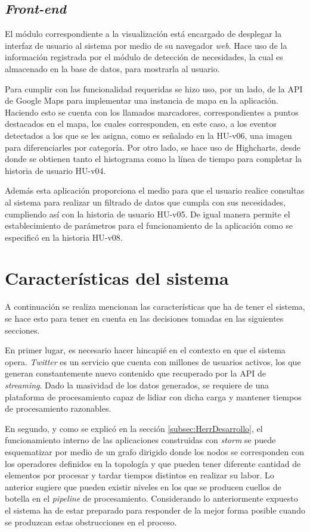 \subsection{\textit{Front-end}}
\label{subsec:front}

El módulo correspondiente a la visualización está encargado de desplegar la interfaz de usuario al sistema por medio de su navegador \textit{web}. Hace uso de la información registrada por el módulo de detección de necesidades, la cual es almacenado en la base de datos, para mostrarla al usuario. 

Para cumplir con las funcionalidad requeridas se hizo uso, por un lado, de la API de Google Maps para implementar una instancia de mapa en la aplicación. Haciendo esto se cuenta con los llamados marcadores, correspondientes a puntos destacados en el mapa, los cuales corresponden, en este caso, a los eventos detectados a los que se les asigna, como es señalado en la HU-v06, una imagen para diferenciarles por categoría. Por otro lado, se hace uso de Highcharts, desde donde se obtienen tanto el histograma como la línea de tiempo para completar la historia de usuario HU-v04.

Además esta aplicación proporciona el medio para que el usuario realice consultas al sistema para realizar un filtrado de datos que cumpla con sus necesidades, cumpliendo así con la historia de usuario HU-v05. De igual manera permite el establecimiento de parámetros para el funcionamiento de la aplicación como se especificó en la historia HU-v08.

\section{Características del sistema}
\label{sec:caracteristicasSistema}

A continuación se realiza mencionan las características que ha de tener el sistema, se hace esto para tener en cuenta en las decisiones tomadas en las siguientes secciones.

En primer lugar, es necesario hacer hincapié en el contexto en que el sistema opera. \textit{Twitter} es un servicio que cuenta con millones de usuarios activos, los que generan constantemente nuevo contenido que recuperado por la API de \textit{streaming}. Dado la masividad de los datos generados, se requiere de una plataforma de procesamiento capaz de lidiar con dicha carga y mantener tiempos de procesamiento razonables.

En segundo, y como se explicó en la sección \ref{subsec:HerrDesarrollo}, el funcionamiento interno de las aplicaciones construidas con \textit{storm} se puede esquematizar por medio de un grafo dirigido donde los nodos se corresponden con los operadores definidos en la topología y que pueden tener diferente cantidad de elementos por procesar y tardar tiempos distintos en realizar su labor. Lo anterior sugiere que pueden existir niveles en los que se producen cuellos de botella en el \textit{pipeline} de procesamiento. Considerando lo anteriormente expuesto el sistema ha de estar preparado para responder de la mejor forma posible cuando se produzcan estas obstrucciones en el proceso.

